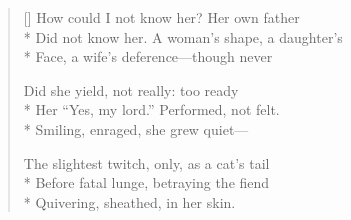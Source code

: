 \label{ch:lear_as}
\settowidth{\versewidth}{Did not know her.  A woman's shape, a daughter's}
\begin{verse}[\versewidth]
How could I not know her? Her own father\\*
Did not know her.  A woman's shape, a daughter's\\*
Face, a wife's deference---though never

Did she yield, not really: too ready\\*
Her ``Yes, my lord.''  Performed, not felt.\\*
Smiling, enraged, she grew quiet---

The slightest twitch, only, as a cat's tail\\*
Before fatal lunge, betraying the fiend\\*
Quivering, sheathed, in her skin.
\end{verse}
